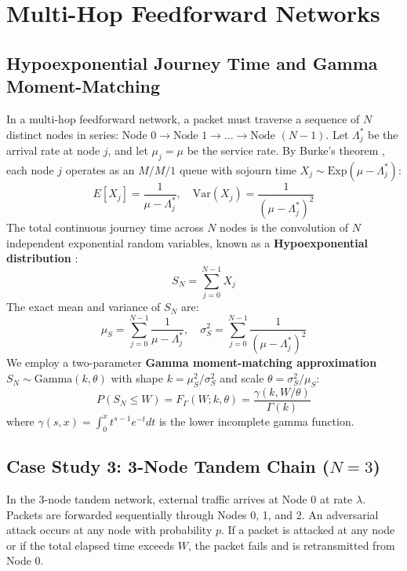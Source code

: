 \documentclass[journal,compsoc]{IEEEtran}
\begin{document}
\section{Multi-Hop Feedforward Networks}
\subsection{Hypoexponential Journey Time and Gamma Moment-Matching}
In a multi-hop feedforward network, a packet must traverse a sequence of $N$ distinct nodes in series: Node $0 \to \text{Node } 1 \to \dots \to \text{Node } (N-1)$. Let $\Lambda_j^*$ be the arrival rate at node $j$, and let $\mu_j = \mu$ be the service rate. By Burke's theorem \cite{burke1956output}, each node $j$ operates as an $M/M/1$ queue with sojourn time $X_j \sim \text{Exp}(\mu - \Lambda_j^*)$:
\begin{equation}
E[X_j] = \frac{1}{\mu - \Lambda_j^*}, \quad \text{Var}(X_j) = \frac{1}{(\mu - \Lambda_j^*)^2}
\end{equation}
The total continuous journey time across $N$ nodes is the convolution of $N$ independent exponential random variables, known as a \textbf{Hypoexponential distribution} \cite{cox1955use}:
\begin{equation}
S_N = \sum_{j=0}^{N-1} X_j
\end{equation}
The exact mean and variance of $S_N$ are:
\begin{equation}
\mu_S = \sum_{j=0}^{N-1} \frac{1}{\mu - \Lambda_j^*}, \quad \sigma_S^2 = \sum_{j=0}^{N-1} \frac{1}{(\mu - \Lambda_j^*)^2}
\end{equation}
We employ a two-parameter \textbf{Gamma moment-matching approximation} \cite{altiok1985approximate} $S_N \sim \text{Gamma}(k, \theta)$ with shape $k = \mu_S^2/\sigma_S^2$ and scale $\theta = \sigma_S^2/\mu_S$:
\begin{equation}
P(S_N \le W) = F_\Gamma(W; k, \theta) = \frac{\gamma(k, W/\theta)}{\Gamma(k)}
\end{equation}
where $\gamma(s, x) = \int_0^x t^{s-1} e^{-t} dt$ is the lower incomplete gamma function.

\subsection{Case Study 3: 3-Node Tandem Chain (\texorpdfstring{$N=3$}{N=3})}
In the 3-node tandem network, external traffic arrives at Node 0 at rate $\lambda$. Packets are forwarded sequentially through Nodes 0, 1, and 2. An adversarial attack occurs at any node with probability $p$. If a packet is attacked at any node or if the total elapsed time exceeds $W$, the packet fails and is retransmitted from Node 0.
\end{document}
